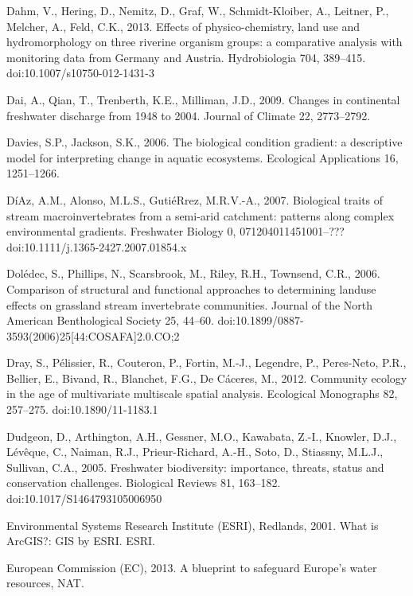 \begin{thebibliography}
\bibitem{} \hangindent=1cm Dahm, V., Hering, D., Nemitz, D., Graf, W., Schmidt-Kloiber, A., Leitner, P., Melcher, A., Feld, C.K., 2013. Effects of physico-chemistry, land use and hydromorphology on three riverine organism groups: a comparative analysis with monitoring data from Germany and Austria. Hydrobiologia 704, 389–415. doi:10.1007/s10750-012-1431-3

\bibitem{} \hangindent=1cm Dai, A., Qian, T., Trenberth, K.E., Milliman, J.D., 2009. Changes in continental freshwater discharge from 1948 to 2004. Journal of Climate 22, 2773–2792.

\bibitem{} \hangindent=1cm Davies, S.P., Jackson, S.K., 2006. The biological condition gradient: a descriptive model for interpreting change in aquatic ecosystems. Ecological Applications 16, 1251–1266.

\bibitem{} \hangindent=1cm DíAz, A.M., Alonso, M.L.S., GutiéRrez, M.R.V.-A., 2007. Biological traits of stream macroinvertebrates from a semi-arid catchment: patterns along complex environmental gradients. Freshwater Biology 0, 071204011451001–??? doi:10.1111/j.1365-2427.2007.01854.x

\bibitem{} \hangindent=1cm Dolédec, S., Phillips, N., Scarsbrook, M., Riley, R.H., Townsend, C.R., 2006. Comparison of structural and functional approaches to determining landuse effects on grassland stream invertebrate communities. Journal of the North American Benthological Society 25, 44–60. doi:10.1899/0887-3593(2006)25[44:COSAFA]2.0.CO;2

\bibitem{} \hangindent=1cm Dray, S., Pélissier, R., Couteron, P., Fortin, M.-J., Legendre, P., Peres-Neto, P.R., Bellier, E., Bivand, R., Blanchet, F.G., De Cáceres, M., 2012. Community ecology in the age of multivariate multiscale spatial analysis. Ecological Monographs 82, 257–275. doi:10.1890/11-1183.1

\bibitem{} \hangindent=1cm Dudgeon, D., Arthington, A.H., Gessner, M.O., Kawabata, Z.-I., Knowler, D.J., Lévêque, C., Naiman, R.J., Prieur-Richard, A.-H., Soto, D., Stiassny, M.L.J., Sullivan, C.A., 2005. Freshwater biodiversity: importance, threats, status and conservation challenges. Biological Reviews 81, 163–182. doi:10.1017/S1464793105006950

\bibitem{} \hangindent=1cm Environmental Systems Research Institute (ESRI), Redlands, 2001. What is ArcGIS?: GIS by ESRI. ESRI.

\bibitem{} \hangindent=1cm European Commission (EC), 2013. A blueprint to safeguard Europe’s water resources, NAT.


\end{thebibliography}
